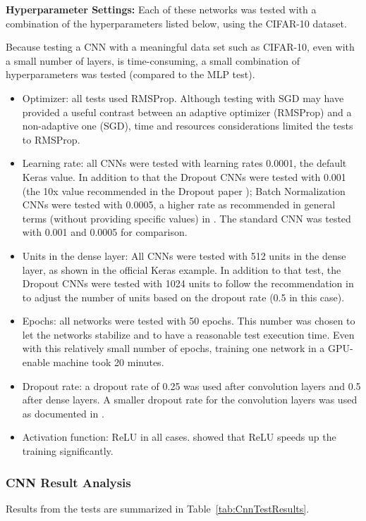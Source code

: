 \documentclass[../dropout-vs-batch-normalization.tex]{subfiles}
\begin{document}
\medskip
\noindent\textbf{Hyperparameter Settings:} Each of these networks was tested with a combination of the hyperparameters listed below, using the CIFAR-10 dataset.

Because testing a CNN with a meaningful data set such as CIFAR-10, even with a small number of layers, is time-consuming, a small combination of hyperparameters was tested (compared to the MLP test).

\begin{itemize}
\item Optimizer: all tests used RMSProp. Although testing with SGD may have provided a useful contrast between an adaptive optimizer (RMSProp) and a non-adaptive one (SGD), time and resources considerations limited the tests to RMSProp.
\item Learning rate: all CNNs were tested with learning rates 0.0001, the default Keras value. In addition to that the Dropout CNNs were tested with 0.001 (the 10x value recommended in the Dropout paper \cite{Srivastava2014}); Batch Normalization CNNs were tested with 0.0005, a higher rate as recommended in general terms (without providing specific values) in \cite{Ioffe2015}. The standard CNN was tested with 0.001 and 0.0005 for comparison.
\item Units in the dense layer: All CNNs were tested with 512 units in the dense layer, as shown in the official Keras example. In addition to that test, the Dropout CNNs were tested with 1024 units to follow the recommendation in \cite{Srivastava2014} to adjust the number of units based on the dropout rate (0.5 in this case).
\item Epochs: all networks were tested with 50 epochs. This number was chosen to let the networks stabilize and to have a reasonable test execution time. Even with this relatively small number of epochs, training one network in a GPU-enable machine took 20 minutes.
\item Dropout rate: a dropout rate of 0.25 was used after convolution layers and 0.5 after dense layers. A smaller dropout rate for the convolution layers was used as documented in \cite{Srivastava2014}.
\item Activation function: ReLU \cite{Nair2010} in all cases. \cite{Krizhevsky2012} showed that ReLU speeds up the training significantly.
\end{itemize}

\medskip
\subsubsection{CNN Result Analysis} Results from the tests are summarized in Table~\ref{tab:CnnTestResults}.
\end{document}

